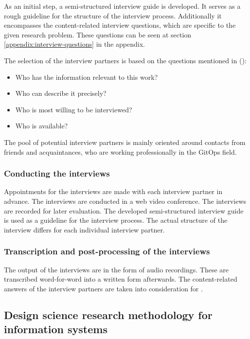 As an initial step,
a semi-structured interview guide is developed.
It serves as a rough guideline for the structure of the interview process.
Additionally it encompasses the content-related interview questions,
which are specific to the given research problem.
These questions can be seen at section \ref{appendix:interview-questions} in the appendix.

The selection of the interview partners is based on the questions mentioned in
\citeauthor{glaser2010experteninterviews} (\citeyear{glaser2010experteninterviews}):

\begin{itemize}
	\item Who has the information relevant to this work?
	\item Who can describe it precisely?
	\item Who is most willing to be interviewed?
	\item Who is available?
\end{itemize}

The pool of potential interview partners is mainly oriented around
contacts from friends and acquaintances,
who are working professionally in the GitOps field.

\subsubsection{Conducting the interviews}

Appointments for the interviews are made with each interview partner in advance. 
The interviews are conducted in a web video conference.
The interviews are recorded for later evaluation.
The developed semi-structured interview guide
is used as a guideline for the interview process.
The actual structure of the interview differs for each individual interview partner.

\subsubsection{Transcription and post-processing of the interviews}

The output of the interviews are in the form of audio recordings.
These are transcribed word-for-word into a written form afterwards.
The content-related answers of the interview partners are taken into consideration
for .

\subsection{Design science research methodology for information systems}

